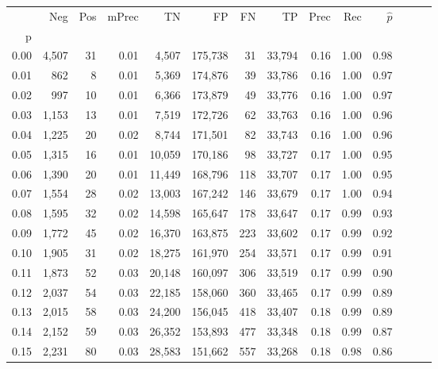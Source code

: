 \begin{tabular}{rrrrrrrrrrrrrr}
\toprule
{} &    Neg &    Pos & mPrec &       TN &       FP &      FN &      TP &  Prec &   Rec & $\hat{p}$ \\
p    &        &        &       &          &          &         &         &       &       &           \\
\midrule
0.00 &  4,507 &     31 &  0.01 &    4,507 &  175,738 &      31 &  33,794 &  0.16 &  1.00 &      0.98 \\
0.01 &    862 &      8 &  0.01 &    5,369 &  174,876 &      39 &  33,786 &  0.16 &  1.00 &      0.97 \\
0.02 &    997 &     10 &  0.01 &    6,366 &  173,879 &      49 &  33,776 &  0.16 &  1.00 &      0.97 \\
0.03 &  1,153 &     13 &  0.01 &    7,519 &  172,726 &      62 &  33,763 &  0.16 &  1.00 &      0.96 \\
0.04 &  1,225 &     20 &  0.02 &    8,744 &  171,501 &      82 &  33,743 &  0.16 &  1.00 &      0.96 \\
0.05 &  1,315 &     16 &  0.01 &   10,059 &  170,186 &      98 &  33,727 &  0.17 &  1.00 &      0.95 \\
0.06 &  1,390 &     20 &  0.01 &   11,449 &  168,796 &     118 &  33,707 &  0.17 &  1.00 &      0.95 \\
0.07 &  1,554 &     28 &  0.02 &   13,003 &  167,242 &     146 &  33,679 &  0.17 &  1.00 &      0.94 \\
0.08 &  1,595 &     32 &  0.02 &   14,598 &  165,647 &     178 &  33,647 &  0.17 &  0.99 &      0.93 \\
0.09 &  1,772 &     45 &  0.02 &   16,370 &  163,875 &     223 &  33,602 &  0.17 &  0.99 &      0.92 \\
0.10 &  1,905 &     31 &  0.02 &   18,275 &  161,970 &     254 &  33,571 &  0.17 &  0.99 &      0.91 \\
0.11 &  1,873 &     52 &  0.03 &   20,148 &  160,097 &     306 &  33,519 &  0.17 &  0.99 &      0.90 \\
0.12 &  2,037 &     54 &  0.03 &   22,185 &  158,060 &     360 &  33,465 &  0.17 &  0.99 &      0.89 \\
0.13 &  2,015 &     58 &  0.03 &   24,200 &  156,045 &     418 &  33,407 &  0.18 &  0.99 &      0.89 \\
0.14 &  2,152 &     59 &  0.03 &   26,352 &  153,893 &     477 &  33,348 &  0.18 &  0.99 &      0.87 \\
0.15 &  2,231 &     80 &  0.03 &   28,583 &  151,662 &     557 &  33,268 &  0.18 &  0.98 &      0.86 \\

\end{tabular}
